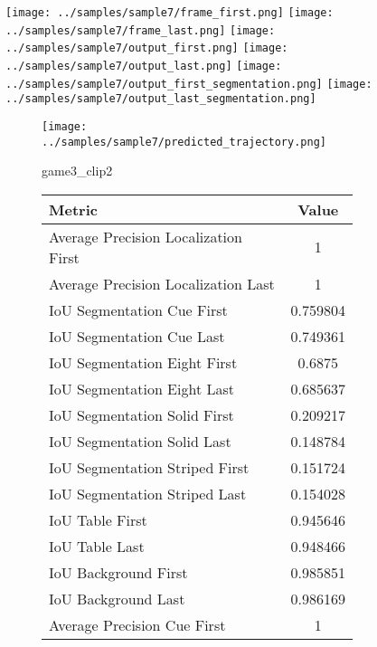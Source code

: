 \begin{figure}
    \texttt{[image: ../samples/sample7/frame\_first.png]}
    \texttt{[image: ../samples/sample7/frame\_last.png]}
    \newline
    \texttt{[image: ../samples/sample7/output\_first.png]}
    \texttt{[image: ../samples/sample7/output\_last.png]}
    \newline
    \texttt{[image: ../samples/sample7/output\_first\_segmentation.png]}
    \texttt{[image: ../samples/sample7/output\_last\_segmentation.png]}
    \newline
    \begin{subfigure}[b]{0.49\textwidth}
        \vspace{20pt}
        \texttt{[image: ../samples/sample7/predicted\_trajectory.png]}
        \caption*{game3\_clip2}
    \end{subfigure}
\begin{subfigure}[b]{0.49\textwidth}
    \begin{tabular}{|l|c|}
        \hline
        \textbf{Metric} & \textbf{Value} \\
        \hline
        Average Precision Localization First & 1 \\
        Average Precision Localization Last & 1 \\
        \hline
        IoU Segmentation Cue First & 0.759804 \\
        IoU Segmentation Cue Last & 0.749361 \\
        IoU Segmentation Eight First & 0.6875 \\
        IoU Segmentation Eight Last & 0.685637 \\
        IoU Segmentation Solid First & 0.209217 \\
        IoU Segmentation Solid Last & 0.148784 \\
        IoU Segmentation Striped First & 0.151724 \\
        IoU Segmentation Striped Last & 0.154028 \\
        \hline
        IoU Table First & 0.945646 \\
        IoU Table Last & 0.948466 \\
        IoU Background First & 0.985851 \\
        IoU Background Last & 0.986169 \\
        \hline
        Average Precision Cue First & 1 \\

\end{tabular}
\end{subfigure}
\end{figure}
